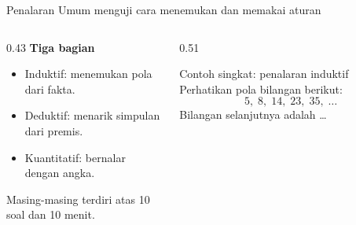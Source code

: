 \begin{frame}{Penalaran Umum menguji cara menemukan dan memakai aturan}
  \begin{columns}[T,onlytextwidth]
    \begin{column}{0.43\textwidth}
      {\color{StudentBlue}\bfseries Tiga bagian}\par
      \begin{itemize}
        \item Induktif: menemukan pola dari fakta.
        \item Deduktif: menarik simpulan dari premis.
        \item Kuantitatif: bernalar dengan angka.
      \end{itemize}
      \vspace{0.10cm}
      {\color{StudentGray}\fontsize{10.8}{13.5}\selectfont Masing-masing terdiri atas 10 soal dan 10 menit.}
    \end{column}
    \begin{column}{0.51\textwidth}
      \begin{block}{Contoh singkat: penalaran induktif}
        Perhatikan pola bilangan berikut:
        \[
          5,\;8,\;14,\;23,\;35,\;\ldots
        \]
        Bilangan selanjutnya adalah \ldots
      \end{block}
    \end{column}
  \end{columns}
\end{frame}

